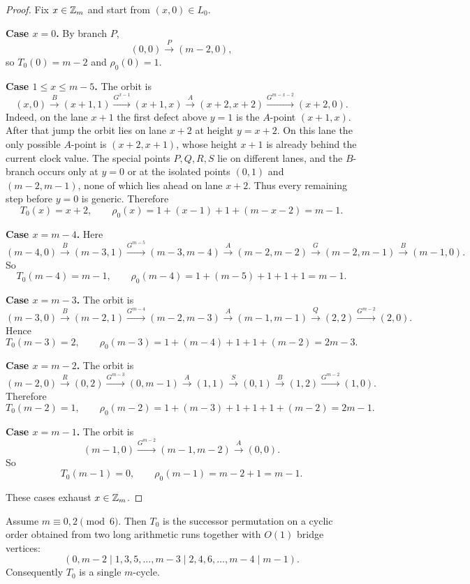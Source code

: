 \begin{proof}
Fix $x\in \mathbb Z_m$ and start from $(x,0)\in L_0$.

\smallskip
\noindent\textbf{Case $x=0$.}
By branch $P$,
\[
(0,0)\xrightarrow{P}(m-2,0),
\]
so $T_0(0)=m-2$ and $\rho_0(0)=1$.

\smallskip
\noindent\textbf{Case $1\le x\le m-5$.}
The orbit is
\[
(x,0)\xrightarrow{B}(x+1,1)\xrightarrow{G^{x-1}}(x+1,x)\xrightarrow{A}(x+2,x+2)
\xrightarrow{G^{m-x-2}}(x+2,0).
\]
Indeed, on the lane $x+1$ the first defect above $y=1$ is the $A$-point $(x+1,x)$.
After that jump the orbit lies on lane $x+2$ at height $y=x+2$.
On this lane the only possible $A$-point is $(x+2,x+1)$, whose height $x+1$ is already behind the current
clock value.
The special points $P,Q,R,S$ lie on different lanes, and the $B$-branch occurs only at $y=0$ or at the
isolated points $(0,1)$ and $(m-2,m-1)$, none of which lies ahead on lane $x+2$.
Thus every remaining step before $y=0$ is generic.
Therefore
\[
T_0(x)=x+2,\qquad
\rho_0(x)=1+(x-1)+1+(m-x-2)=m-1.
\]

\smallskip
\noindent\textbf{Case $x=m-4$.}
Here
\[
(m-4,0)\xrightarrow{B}(m-3,1)\xrightarrow{G^{m-5}}(m-3,m-4)\xrightarrow{A}(m-2,m-2)
\xrightarrow{G}(m-2,m-1)\xrightarrow{B}(m-1,0).
\]
So
\[
T_0(m-4)=m-1,\qquad
\rho_0(m-4)=1+(m-5)+1+1+1=m-1.
\]

\smallskip
\noindent\textbf{Case $x=m-3$.}
The orbit is
\[
(m-3,0)\xrightarrow{B}(m-2,1)\xrightarrow{G^{m-4}}(m-2,m-3)\xrightarrow{A}(m-1,m-1)
\xrightarrow{Q}(2,2)\xrightarrow{G^{m-2}}(2,0).
\]
Hence
\[
T_0(m-3)=2,\qquad
\rho_0(m-3)=1+(m-4)+1+1+(m-2)=2m-3.
\]

\smallskip
\noindent\textbf{Case $x=m-2$.}
The orbit is
\[
(m-2,0)\xrightarrow{R}(0,2)\xrightarrow{G^{m-3}}(0,m-1)\xrightarrow{A}(1,1)\xrightarrow{S}(0,1)
\xrightarrow{B}(1,2)\xrightarrow{G^{m-2}}(1,0).
\]
Therefore
\[
T_0(m-2)=1,\qquad
\rho_0(m-2)=1+(m-3)+1+1+1+(m-2)=2m-1.
\]

\smallskip
\noindent\textbf{Case $x=m-1$.}
The orbit is
\[
(m-1,0)\xrightarrow{G^{m-2}}(m-1,m-2)\xrightarrow{A}(0,0).
\]
So
\[
T_0(m-1)=0,\qquad \rho_0(m-1)=m-2+1=m-1.
\]

These cases exhaust $x\in \mathbb Z_m$.
\end{proof}

\begin{proposition}\label{prop:R0-caseI-blocks}
Assume $m\equiv 0,2\pmod 6$.
Then $T_0$ is the successor permutation on a cyclic order obtained from two long arithmetic runs together with $O(1)$ bridge vertices:
\[
(0,m-2\mid 1,3,5,\dots,m-3\mid 2,4,6,\dots,m-4\mid m-1).
\]
Consequently $T_0$ is a single $m$-cycle.
\end{proposition}

